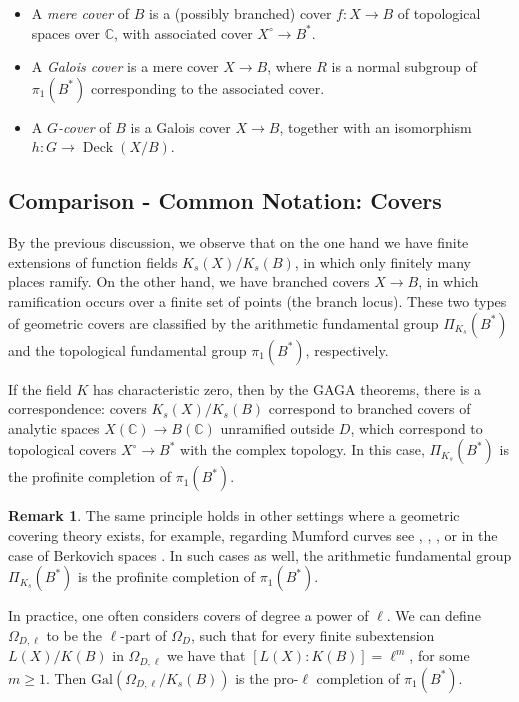 \documentclass[10pt]{amsart}
\theoremstyle{definition}
\newtheorem{remark}[theorem]{Remark}
\newcommand{\Gal}{{ \mathrm{Gal}}}
\begin{document}
 



\begin{itemize}
\item A  {\em mere cover} of $B$ is a (possibly branched) cover $f\colon X \rightarrow B$  of topological spaces over $\mathbb{C}$, with associated cover $X^\circ \rightarrow B^*$.
\item  A {\em Galois cover} is a mere cover $X \to B$, where $R$ is a normal subgroup of $\pi_1(B^*)$ corresponding to the associated cover.
\item A {\em $G$-cover} of $B$ is a Galois cover $X \rightarrow B$, together with an isomorphism $h\colon G \rightarrow \operatorname{Deck}(X/B)$.
\end{itemize}

\subsection{Comparison - Common Notation: Covers}

By the previous discussion, we observe that on the one hand we have finite extensions of function fields 
$K_s(X)/K_s(B)$, in which only finitely many places ramify. On the other hand, we have branched covers $X\rightarrow B$, in which ramification occurs over a finite set of points (the branch locus). These two types of geometric covers are classified by the arithmetic fundamental group $\Pi_{K_s}(B^*)$ and the topological fundamental group $\pi_1(B^*)$, respectively.


If the field $K$ has characteristic zero, then by the GAGA theorems, there is a correspondence: covers $K_s(X)/K_s(B)$ correspond to branched covers of analytic spaces $X(\mathbb{C}) \rightarrow B(\mathbb{C})$ unramified outside $D$, which correspond to topological covers $X^\circ \rightarrow B^*$ with the complex topology. In this case, $\Pi_{K_s}(B^*)$ is the profinite completion of $\pi_1(B^*)$. 

\begin{remark}{\label{rem:profComp}}
The same principle holds in other settings where a geometric covering theory exists,
for example, regarding Mumford curves see 
\cite{CKNotices}, \cite{CKK}, \cite{mumford-curves}, or in the case of Berkovich spaces \cite{Berk:90}. In such cases as well, the arithmetic fundamental group $\Pi_{K_s}(B^*)$ is the profinite completion of $\pi_1(B^*)$.
\end{remark}

In practice, one often considers covers of degree a power of $\ell$. We can define $\Omega_{D,\ell}$ to be the $\ell$-part of $\Omega_D$, such that for every finite subextension $L(X)/K(B)$ in $\Omega_{D,\ell}$ we have that $[L(X):K(B)]=\ell^m$, for some $m\geq 1$. Then $\Gal(\Omega_{D,\ell}/K_s(B))$ is the pro-$\ell$ completion of $\pi_1(B^*)$.
\end{document}
